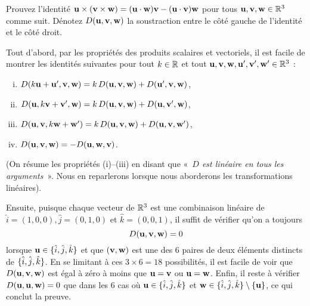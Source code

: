 \begin{prob} \label{prob03.10} Prouvez l'identité $\mathbf{u} \times (\mathbf{v}\times \mathbf{w})= (\mathbf{u}\cdot \mathbf{w}) \mathbf{v} -(\mathbf{u}\cdot \mathbf{v}) \mathbf{w}$ pour tous $\mathbf{u},\mathbf{v},\mathbf{w} \in \mathbb{R}^3$ comme suit. Dénotez  $D(\mathbf{u},\mathbf{v},\mathbf{w})$ la soustraction entre le côté gauche de l'identité et le côté droit.

Tout d'abord, par les propriétés des produits scalaires et vectoriels, il est facile de montrer les identités suivantes pour tout $k\in \mathbb{R}$ et tout $\mathbf{u},\mathbf{v},\mathbf{w},\mathbf{u}',\mathbf{v}',\mathbf{w}' \in \mathbb{R}^3$ :
 
\medskip
\begin{enumerate}[(i)]
 
\item $D(k \mathbf{u} +\mathbf{u}', \mathbf{v} ,\mathbf{w}) =k\, D(\mathbf{u},\mathbf{v},\mathbf{w}) +D(\mathbf{u}',\mathbf{v},\mathbf{w})$,
\medskip

\item  $D(\mathbf{u} , k \mathbf{v} +\mathbf{v}',\mathbf{w}) =k\,D(\mathbf{u},\mathbf{v},\mathbf{w})  + D(\mathbf{u},\mathbf{v}',\mathbf{w})$,
\medskip
\item $D(\mathbf{u}, \mathbf{v},k \mathbf{w} +\mathbf{w}') =k\, D(\mathbf{u} , \mathbf{v},\mathbf{w})+ D(\mathbf{u}, \mathbf{v},\mathbf{w}')$,
\medskip
\item $D(\mathbf{u}, \mathbf{v},\mathbf{w}) =-D(\mathbf{u},\mathbf{w},\mathbf{v}) $.
\medskip
\end{enumerate}

(On résume les propriétés (i)--(iii) en disant que  «~{\it $D$ est linéaire en tous les arguments}~». Nous en reparlerons lorsque nous aborderons les transformations linéaires).
\medskip 

Ensuite, puisque chaque vecteur de $\mathbb{R}^3$ est une combinaison linéaire de $\hat i= (1,0,0), \hat j =(0,1,0)$ et $\hat k=(0,0,1)$, il suffit de vérifier qu'on a toujours 
$$D(\mathbf{u}, \mathbf{v},\mathbf{w})=0$$ 
lorsque $\mathbf{u}\in\{\hat i, \hat j, \hat k\}$ et que $(\mathbf{v}, \mathbf{w})$ est une des 6 paires de deux éléments distincts de $\{\hat i, \hat j, \hat k\}$. 
En se limitant à ces $3\times 6= 18$ possibilités, il est facile de voir que $D(\mathbf{u},\mathbf{v},\mathbf{w})$ est égal à zéro à moins que $\mathbf{u} = \mathbf{v}$ ou $\mathbf{u} = \mathbf{w}$. Enfin, il reste à vérifier $D(\mathbf{u},\mathbf{u},\mathbf{w})=0$ que dans les 6 cas où $\mathbf{u}\in \{\hat i, \hat j, \hat k\}$ et $\mathbf{w} \in \{\hat i, \hat j, \hat k\}\setminus\{\mathbf{u}\}$, ce qui conclut la preuve.  
  
\end{prob} 